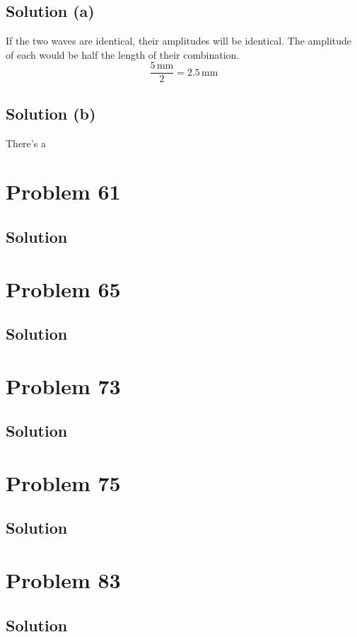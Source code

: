 \documentclass[12pt]{article}
\begin{document}
        \subsection{Solution (a)}
            If the two waves are identical, their amplitudes will be identical.
            The amplitude of each would be half the length of their combination.
            \begin{equation}
                \frac{5\,\unit{\milli\meter}}{2}    =   \boxed{2.5\,\unit{\milli\meter}}
            \end{equation}

        \subsection{Solution (b)}
            There's a 

    \pagebreak
    \section{Problem 61}

        \subsection{Solution}

    \pagebreak
    \section{Problem 65}

        \subsection{Solution}

    \pagebreak
    \section{Problem 73}

        \subsection{Solution}

    \pagebreak
    \section{Problem 75}

        \subsection{Solution}

    \pagebreak
    \section{Problem 83}

        \subsection{Solution}

    \pagebreak

    \tableofcontents
    
\end{document}
